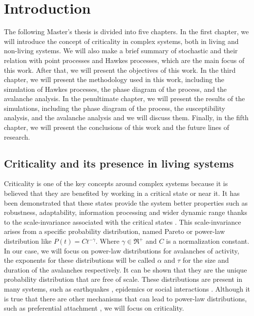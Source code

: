 \chapter{Introduction}\label{ch:intro}

The following Master's thesis is divided into five chapters. In the first chapter, we will introduce the concept of criticality in complex systems, both in living and non-living systems.  
We will also make a brief summary of stochastic and their relation with point processes and Hawkes processes, which are the main focus of this work. 
After that, we will present the objectives of this work. In the third chapter, we will present the methodology used in this work, including the simulation of Hawkes processes, 
the phase diagram of the process, and the avalanche analysis. In the penultimate chapter, we will present the results of the simulations, including the phase diagram of the process, the 
susceptibility analysis, and the avalanche analysis and we will discuss them. Finally, in the fifth chapter, we will present the conclusions of this work and the future lines of research.

\section{Criticality and its presence in living systems}

Criticality is one of the key concepts around complex systems because it is believed that they are benefited by working in a critical state or near it. It has been demonstrated that
these states provide the system better properties such as robustness, adaptability, information processing and wider dynamic range thanks to the scale-invariance associated with the
critical states \cite{munoz2018colloquium}. This scale-invariance arises from a specific probability distribution, named Pareto or power-law distribution like $P(t) = Ct^{-\gamma}$.
Where $\gamma\in\Re^+$ and $C$ is a normalization constant. In our case, we will focus on power-law distributions for avalanches of activity, the exponents for these distributions will be called
$\alpha$ and $\tau$ for the size and duration of the avalanches respectively.
It can be shown that they are the unique probability distribution that are free of scale. These distributions are present
in many systems, such as earthquakes \cite{baiesi2004scale}, epidemics \cite{pastor2015epidemic} or social interactions \cite{castellano2009statistical, aparicio2015model}. 
Although it is true that there are other mechanisms that can lead to power-law distributions, such as preferential attachment \cite{barabasi1999emergence}, we will focus on criticality. 

